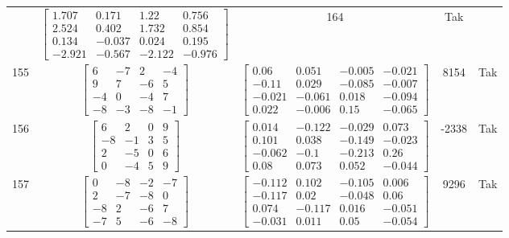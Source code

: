 \documentclass[a4paper,12pt]{article}
\begin{document}
\begin{tabular}{c c c c c}
&
$\begin{bmatrix} 1.707 & 0.171 & 1.22 & 0.756 \\ 2.524 & 0.402 & 1.732 & 0.854 \\ 0.134 & -0.037 & 0.024 & 0.195 \\ -2.921 & -0.567 & -2.122 & -0.976 \end{bmatrix}$
&
164
&
Tak
\\
155
&
$\begin{bmatrix} 6 & -7 & 2 & -4 \\ 9 & 7 & -6 & 5 \\ -4 & 0 & -4 & 7 \\ -8 & -3 & -8 & -1 \end{bmatrix}$
&
$\begin{bmatrix} 0.06 & 0.051 & -0.005 & -0.021 \\ -0.11 & 0.029 & -0.085 & -0.007 \\ -0.021 & -0.061 & 0.018 & -0.094 \\ 0.022 & -0.006 & 0.15 & -0.065 \end{bmatrix}$
&
8154
&
Tak
\\
156
&
$\begin{bmatrix} 6 & 2 & 0 & 9 \\ -8 & -1 & 3 & 5 \\ 2 & -5 & 0 & 6 \\ 0 & -4 & 5 & 9 \end{bmatrix}$
&
$\begin{bmatrix} 0.014 & -0.122 & -0.029 & 0.073 \\ 0.101 & 0.038 & -0.149 & -0.023 \\ -0.062 & -0.1 & -0.213 & 0.26 \\ 0.08 & 0.073 & 0.052 & -0.044 \end{bmatrix}$
&
-2338
&
Tak
\\
157
&
$\begin{bmatrix} 0 & -8 & -2 & -7 \\ 2 & -7 & -8 & 0 \\ -8 & 2 & -6 & 7 \\ -7 & 5 & -6 & -8 \end{bmatrix}$
&
$\begin{bmatrix} -0.112 & 0.102 & -0.105 & 0.006 \\ -0.117 & 0.02 & -0.048 & 0.06 \\ 0.074 & -0.117 & 0.016 & -0.051 \\ -0.031 & 0.011 & 0.05 & -0.054 \end{bmatrix}$
&
9296
&
Tak
\\

\end{tabular}
\end{document}

